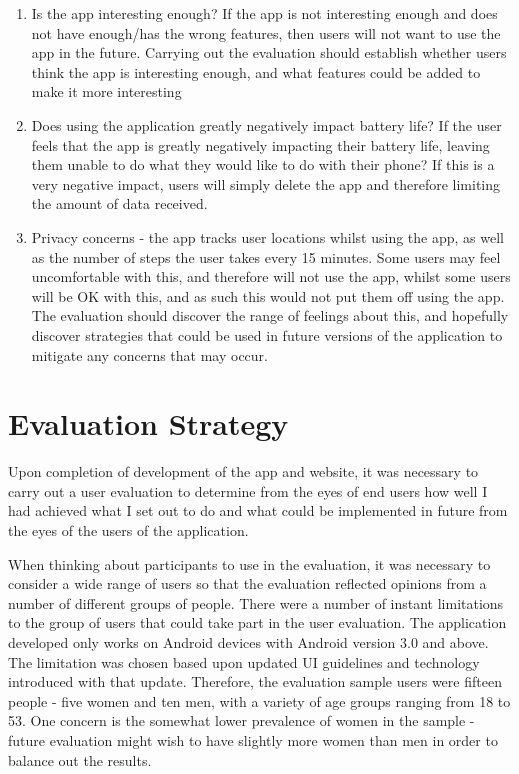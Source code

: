 \documentclass{l4proj}
\begin{document}
\begin{enumerate}

\item{Is the app interesting enough? If the app is not interesting enough and does not have enough/has the wrong features, then users will not want to use the app in the future. Carrying out the evaluation should establish whether users think the app is interesting enough, and what features could be added to make it more interesting}

\item{Does using the application greatly negatively impact battery life? If the user feels that the app is greatly negatively impacting their battery life, leaving them unable to do what they would like to do with their phone? If this is a very negative impact, users will simply delete the app and therefore limiting the amount of data received.}

\item{Privacy concerns - the app tracks user locations whilst using the app, as well as the number of steps the user takes every 15 minutes. Some users may feel uncomfortable with this, and therefore will not use the app, whilst some users will be OK with this, and as such this would not put them off using the app. The evaluation should discover the range of feelings about this, and hopefully discover strategies that could be used in future versions of the application to mitigate any concerns that may occur.}

\end{enumerate}

\section{Evaluation Strategy}

Upon completion of development of the app and website, it was necessary to carry out a user evaluation to determine from the eyes of end users how well I had achieved what I set out to do and what could be implemented in future from the eyes of the users of the application.

When thinking about participants to use in the evaluation, it was necessary to consider a wide range of users so that the evaluation reflected opinions from a number of different groups of people. There were a number of instant limitations to the group of users that could take part in the user evaluation. The application developed only works on Android devices with Android version 3.0 and above. The limitation was chosen based upon updated UI guidelines and technology introduced with that update. Therefore, the evaluation sample users were fifteen people - five women and ten men, with a variety of age groups ranging from 18 to 53. One concern is the somewhat lower prevalence of women in the sample - future evaluation might wish to have slightly more women than men in order to balance out the results. 
\end{document}
